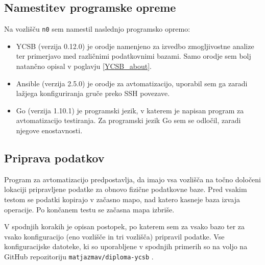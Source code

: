 \documentclass[a4paper, 12pt]{book}
\begin{document}
\subsection{Namestitev programske opreme}
Na vozlišču \texttt{n0} sem namestil naslednjo programsko opremo:
\begin{itemize}
    \item YCSB (verzija 0.12.0) \cite{brianfrankcooper/YCSB} je orodje namenjeno za izvedbo zmogljivostne analize ter primerjavo med različnimi podatkovnimi bazami. Samo orodje sem bolj natančno opisal v poglavju \ref{YCSB_about}.
    \item Ansible (verzija 2.5.0) \cite{Ansible} je orodje za avtomatizacijo, uporabil sem ga zaradi lažjega konfiguriranja gruče preko SSH povezave.
    \item Go (verzija 1.10.1) \cite{Golang} je programski jezik, v katerem je napisan program za avtomatizacijo testiranja. Za programski jezik Go sem se odločil, zaradi njegove enostavnosti.
\end{itemize} 

\subsection{Priprava podatkov}
\label{benchmarking-prepare-data}
Program za avtomatizacijo predpostavlja, da imajo vsa vozlišča na točno določeni lokaciji pripravljene podatke za obnovo fizične podatkovne baze. Pred vsakim testom se podatki kopirajo v začasno mapo, nad katero kasneje baza izvaja operacije. Po končanem testu se začasna mapa izbriše.

V spodnjih korakih je opisan postopek, po katerem sem za vsako bazo ter za vsako konfiguracijo (eno vozlišče in tri vozlišča) pripravil podatke. Vse konfiguracijske datoteke, ki so uporabljene v spodnjih primerih so na voljo na GitHub repozitoriju \texttt{matjazmav/diploma-ycsb} \cite{matjazmav/diploma-ycsb}.
\end{document}
